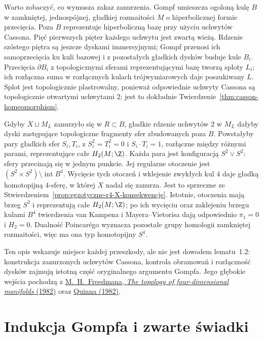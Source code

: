 \begin{uwaga}
\label{rem:egzotyczne-r4-mechanizm}
Warto zobaczyć, co wymusza zakaz zanurzenia.
Gompf umieszcza ogoloną kulę $B$ w zamkniętej,
jednospójnej, gładkiej rozmaitości $M$ o
hiperbolicznej formie przecięcia. Poza $B$
reprezentuje hiperboliczną bazę przy użyciu
uchwytów Cassona. Pięć pierwszych pięter
każdego uchwytu jest zwartą wieżą. Rdzenie
szóstego piętra są jeszcze dyskami immersyjnymi;
Gompf przenosi ich samoprzecięcia ku kuli bazowej
i z pozostałych gładkich dysków buduje kule $B_i$.
Przecięcia $\partial B_i$ z topologicznymi
sferami reprezentującymi bazę tworzą sploty $L_i$;
ich rozłączna suma w rozłącznych kulach
trójwymiarowych daje poszukiwany $L$.
Splot jest topologicznie plastrowalny, ponieważ
odpowiednie uchwyty Cassona są topologicznie
otwartymi uchwytami $2$; jest to dokładnie
Twierdzenie~\ref{thm:casson-homeomorphism}.

Gdyby $X\sqcup M_L$ zanurzyło się w $R\subset B$,
gładkie rdzenie uchwytów $2$ w $M_L$ dałyby
dyski zastępujące topologiczne fragmenty sfer
zbudowanych poza $B$. Powstałyby pary gładkich
sfer $S_i,T_i$, z
$S_i^2=T_i^2=0$ i $S_i\cdot T_i=1$,
rozłączne między różnymi parami, reprezentujące
całe $H_2(M;\Z)$. Każda para jest konfiguracją
$S^2\vee S^2$: sfery przecinają się w jednym
punkcie. Jej regularne otoczenie jest
$(S^2\times S^2)\setminus\operatorname{int}B^4$.
Wycięcie tych otoczeń i wklejenie zwykłych
kul $4$ daje gładką homotopijną $4$-sferę,
w której $X$ nadal się zanurza. Jest to sprzeczne
ze Stwierdzeniem~\ref{prop:egzotyczne-r4-X-konsekwencje}.
Istotnie, otoczenia mają brzeg $S^3$ i
reprezentują całe $H_2(M;\Z)$; po ich wycięciu
oraz zaklejeniu brzegu kulami $B^4$ twierdzenia
van Kampena i Mayera--Vietorisa dają odpowiednio
$\pi_1=0$ i $H_2=0$. Dualność Poincarégo
wyznacza pozostałe grupy homologii zamkniętej
rozmaitości, więc ma ona typ homotopijny $S^4$.

Ten opis wskazuje miejsce każdej przeszkody,
ale nie jest dowodem lematu~1.2: konstrukcja
zanurzonych uchwytów Cassona, kontrola obramowań
i rozłączność dysków zajmują istotną część
oryginalnego argumentu Gompfa. Jego głębokie
wejścia pochodzą z
\href{https://doi.org/10.4310/jdg/1214437136}
{M.~H.~Freedmana, \emph{The topology of
four-dimensional manifolds} (1982)} oraz
\href{https://doi.org/10.4310/jdg/1214437139}
{Quinna (1982)}.
\end{uwaga}

\section{Indukcja Gompfa i zwarte świadki}
\label{sec:egzotyczne-r4-indukcja}

